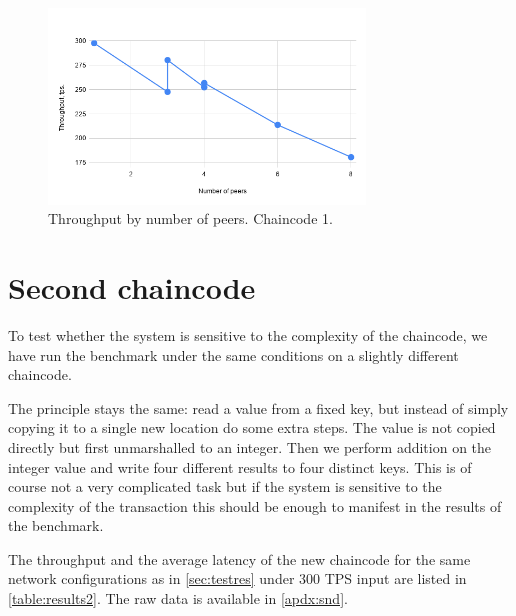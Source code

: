 \begin{figure}[H]
\begin{center}
\includegraphics[width=0.75\textwidth]{figures/tps1}
\end{center}
\caption{Throughput by number of peers. Chaincode 1.}
\label{fig:tps1}
\end{figure}

\newpage
\section{Second chaincode} \label{sec:secondchain}

To test whether the system is sensitive to the complexity of the chaincode, we have run the benchmark under the same conditions on a slightly different chaincode.

The principle stays the same: read a value from a fixed key, but instead of simply copying it to a single new location do some extra steps. The value is not copied directly but first unmarshalled to an integer. Then we perform addition on the integer value and write four different results to four distinct keys. This is of course not a very complicated task but if the system is sensitive to the complexity of the transaction this should be enough to manifest in the results of the benchmark.

The throughput and the average latency of the new chaincode for the same network configurations as in \ref{sec:testres} under 300 TPS input are listed in \ref{table:results2}. The raw data is available in \ref{apdx:snd}.

